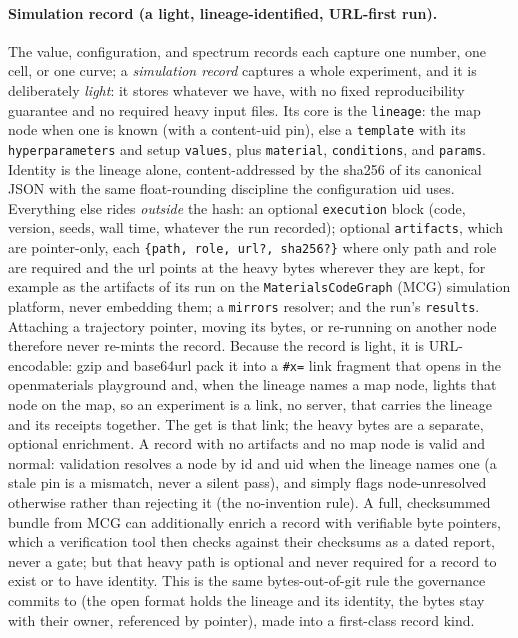 \documentclass[11pt,a4paper]{article}
\begin{document}
\paragraph{Simulation record (a light, lineage-identified, URL-first run).} The
value, configuration, and spectrum records each capture one number, one cell, or
one curve; a \emph{simulation record} captures a whole experiment, and it is
deliberately \emph{light}: it stores whatever we have, with no fixed
reproducibility guarantee and no required heavy input files. Its core is the
\texttt{lineage}: the map node when one is known (with a content-uid pin), else a
\texttt{template} with its \texttt{hyperparameters} and setup \texttt{values},
plus \texttt{material}, \texttt{conditions}, and \texttt{params}. Identity is the
lineage alone, content-addressed by the sha256 of its canonical JSON with the same
float-rounding discipline the configuration uid uses. Everything else rides
\emph{outside} the hash: an optional \texttt{execution} block (code, version,
seeds, wall time, whatever the run recorded); optional \texttt{artifacts}, which
are pointer-only, each \texttt{\{path, role, url?, sha256?\}} where only path and
role are required and the url points at the heavy bytes wherever they are kept,
for example as the artifacts of its run on the \texttt{MaterialsCodeGraph} (MCG)
simulation platform, never embedding them; a \texttt{mirrors} resolver; and the
run's \texttt{results}. Attaching a trajectory pointer, moving its bytes, or
re-running on another node therefore never re-mints the record. Because the
record is light, it is URL-encodable: gzip and base64url pack it into a
\texttt{\#x=} link fragment that opens in the openmaterials playground and, when
the lineage names a map node, lights that node on the map, so an experiment is a
link, no server, that carries the lineage and its receipts together. The get is
that link; the heavy bytes are a separate, optional enrichment. A record with no
artifacts and no map node is valid and normal: validation resolves a node by id
and uid when the lineage names one (a stale pin is a mismatch, never a silent
pass), and simply flags node-unresolved otherwise rather than rejecting it (the
no-invention rule). A full, checksummed bundle from MCG can additionally enrich a
record with verifiable byte pointers, which a verification tool then checks
against their checksums as a dated report, never a gate; but that heavy path is
optional and never required for a record to exist or to have identity. This is
the same bytes-out-of-git rule the governance commits to (the open format holds
the lineage and its identity, the bytes stay with their owner, referenced by
pointer), made into a first-class record kind.
\end{document}
